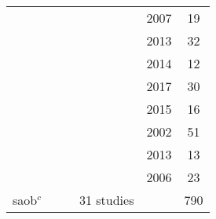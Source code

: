 \begin{tabular}{ cccccc }
 & & & \citeauthor{Leins2007} & 2007 & 19 \\
 & & & \citeauthor{Li2013} & 2013 & 32 \\
 & & & \citeauthor{Meisel2014} & 2014 & 12 \\
 & & & \citeauthor{Mohagheghi2017} & 2017 & 30 \\
 & & & \citeauthor{Mohammadi2015} & 2015 & 16 \\
 & & & \citeauthor{Monastra2002} & 2002 & 51 \\
 & & & \citeauthor{Ogrim2013} & 2013 & 13 \\
 & & & \citeauthor{Strehl2006} & 2006 & 23 \\
 \gls{saob}$^c$ & & & 31 studies & & 790 \\
\bottomrule
\end{tabular}
